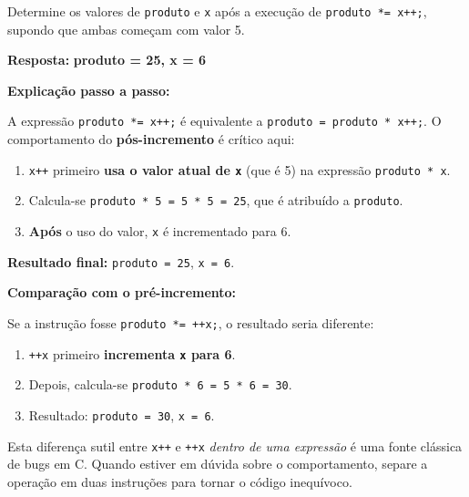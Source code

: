 \documentclass[12pt,a4paper]{article}
\begin{document}
\begin{enunciadoBox}[Enunciado 3.6]
Determine os valores de \texttt{produto} e \texttt{x} após a execução de
\texttt{produto *= x++;}, supondo que ambas começam com valor 5.
\end{enunciadoBox}

\begin{respostabox}
\textbf{Resposta:} \textcolor{deitelblue}{\textbf{produto = 25, x = 6}}

\medskip\textbf{Explicação passo a passo:}

A expressão \texttt{produto *= x++;} é equivalente a
\texttt{produto = produto * x++;}. O comportamento do \textbf{pós-incremento} é
crítico aqui:

\begin{enumerate}
  \item \texttt{x++} primeiro \textbf{usa o valor atual de \texttt{x}} (que é 5)
  na expressão \texttt{produto * x}.
  \item Calcula-se \texttt{produto * 5 = 5 * 5 = 25}, que é atribuído a \texttt{produto}.
  \item \textbf{Após} o uso do valor, \texttt{x} é incrementado para 6.
\end{enumerate}

\textbf{Resultado final:} \texttt{produto = 25}, \texttt{x = 6}.

\medskip
\textbf{Comparação com o pré-incremento:}

Se a instrução fosse \texttt{produto *= ++x;}, o resultado seria diferente:
\begin{enumerate}[noitemsep]
  \item \texttt{++x} primeiro \textbf{incrementa \texttt{x} para 6}.
  \item Depois, calcula-se \texttt{produto * 6 = 5 * 6 = 30}.
  \item Resultado: \texttt{produto = 30}, \texttt{x = 6}.
\end{enumerate}

\begin{prev}
  Esta diferença sutil entre \texttt{x++} e \texttt{++x} \textit{dentro de uma
  expressão} é uma fonte clássica de bugs em C. Quando estiver em dúvida sobre
  o comportamento, separe a operação em duas instruções para tornar o código
  inequívoco.
\end{prev}
\end{respostabox}

\newpage

\end{document}
